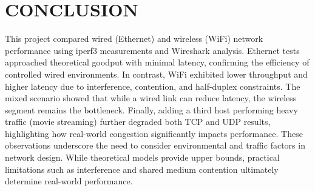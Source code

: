 
\section{CONCLUSION} \label{sec:conclusion}





This project compared wired (Ethernet) and wireless (WiFi) network performance using iperf3 measurements and Wireshark analysis. Ethernet tests approached theoretical goodput with minimal latency, confirming the efficiency of controlled wired environments. In contrast, WiFi exhibited lower throughput and higher latency due to interference, contention, and half-duplex constraints. The mixed scenario showed that while a wired link can reduce latency, the wireless segment remains the bottleneck. Finally, adding a third host performing heavy traffic (movie streaming) further degraded both TCP and UDP results, highlighting how real-world congestion significantly impacts performance. These observations underscore the need to consider environmental and traffic factors in network design. While theoretical models provide upper bounds, practical limitations such as interference and shared medium contention ultimately determine real-world performance.
